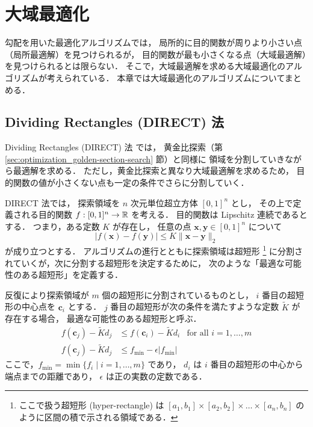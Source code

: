 %

\chapter{大域最適化}

勾配を用いた最適化アルゴリズムでは，
局所的に目的関数が周りより小さい点（局所最適解）を見つけられるが，
目的関数が最も小さくなる点（大域最適解）を見つけられるとは限らない．
そこで，大域最適解を求める大域最適化のアルゴリズムが考えられている．
本章では大域最適化のアルゴリズムについてまとめる．

\section{Dividing Rectangles (DIRECT) 法}\label{sec:optimization_direct}

Dividing Rectangles (DIRECT) 法 \cite{Jones1993} では，
黄金比探索（第 \ref{sec:optimization_golden-section-search} 節）と同様に
領域を分割していきながら最適解を求める．
ただし，黄金比探索と異なり大域最適解を求めるため，
目的関数の値が小さくない点も一定の条件でさらに分割していく．

DIRECT 法では，
探索領域を $n$ 次元単位超立方体 $[0, 1]^n$ とし，
その上で定義される目的関数 $f : [0, 1]^n \to \mathbb{R}$ を考える．
目的関数は Lipschitz 連続であるとする．
つまり，ある定数 $K$ が存在し，
任意の点 $\bm{x}, \bm{y} \in [0, 1]^n$ について
\begin{equation}
    |f(\bm{x}) - f(\bm{y})| \le K \|\bm{x} - \bm{y}\|_2
\end{equation}
が成り立つとする．
アルゴリズムの進行とともに探索領域は超短形
\footnote{ここで扱う超短形 (hyper-rectangle) は%
$[a_1, b_1] \times [a_2, b_2] \times \ldots \times [a_n, b_n]$%
のように区間の積で示される領域である．}
に分割されていくが，次に分割する超短形を決定するために，
次のような「最適な可能性のある超短形」を定義する．

\begin{definition}
    \label{def:optimization_direct_potentially-optimal}
    反復により探索領域が $m$ 個の超短形に分割されているものとし，
    $i$ 番目の超短形の中心点を $\bm{c}_i$ とする．
    $j$ 番目の超短形が次の条件を満たすような定数 $\tilde{K}$ が存在する場合，
    最適な可能性のある超短形と呼ぶ．
    \begin{align}
        f(\bm{c}_j) - \tilde{K} d_j &\le f(\bm{c}_i) - \tilde{K} d_i & \text{for all $i = 1, \ldots, m$}
        \label{eq:optimization_direct_potentially-optimal_smaller-than-others}
        \\
        f(\bm{c}_j) - \tilde{K} d_j &\le f_{\text{min}} - \epsilon |f_{\text{min}}|
        \label{eq:optimization_direct_potentially-optimal_smaller-than-now}
    \end{align}
    ここで，$f_{\text{min}} = \min{\{f_i \mid i = 1, \ldots, m\}}$ であり，
    $d_i$ は $i$ 番目の超短形の中心から端点までの距離であり，
    $\epsilon$ は正の実数の定数である．
\end{definition}

